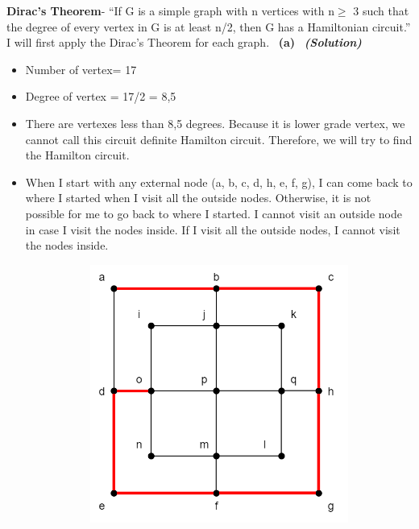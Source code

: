 \documentclass[a4 paper]{article}
\numberwithin{equation}{section}
\newcommand{\subproblem}[1]{~\newline\textbf{(#1)}}
\newcommand{\solution}{~\newline\textbf{\textit{(Solution)}} }
\newcommand{\0}{\mathbf{0}}
\begin{document}
\textbf{Dirac’s Theorem}- “If G is a simple graph with n vertices with n$\geq$ 3 such that the degree of every vertex in G is at least n/2, then G has a Hamiltonian circuit.”
\newline
\newline
I will first apply the Dirac's Theorem for each graph.
\newpage
\subproblem{a} \solution\\
    \begin{itemize}
        \item Number of vertex= 17
        \item Degree of vertex = 17/2 = 8,5
        \item There are vertexes less than 8,5 degrees. Because it is lower grade vertex, we cannot call this circuit definite Hamilton circuit. Therefore, we will try to find the Hamilton circuit.
        \item When I start with any external node (a, b, c, d, h, e, f, g), I can come back to where I started when I visit all the outside nodes. Otherwise, it is not possible for me to go back to where I started. I cannot visit an outside node in case I visit the nodes inside. If I visit all the outside nodes, I cannot visit the nodes inside.
        \begin{figure}[h]
            \centering
            \begin{subfigure}[b]{0.4\textwidth}
             \centering
             \includegraphics[width=\textwidth]{q2-a1.png}

\end{subfigure}
\end{figure}
\end{itemize}
\end{document}
